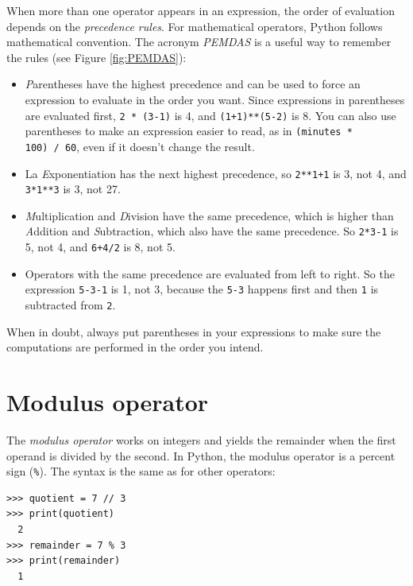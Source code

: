 When more than one operator appears in an expression, the order of evaluation depends on the \emph{precedence rules}. For mathematical operators, Python follows mathematical convention. The acronym \emph{PEMDAS}  is a useful way to remember the rules (see Figure \ref{fig:PEMDAS}):


\begin{itemize}
\item
  \emph{P}arentheses have the highest precedence and can be used to force an expression to evaluate in the order you want. Since expressions in parentheses are evaluated first, \texttt{2\ *\ (3-1)} is 4, and \texttt{(1+1)**(5-2)} is 8. You can also use parentheses to make an expression easier to read, as in \texttt{(minutes\ * 100)\ /\ 60}, even if it doesn't change the result.
\item
  La \emph{E}xponentiation has the next highest precedence, so \texttt{2**1+1} is 3, not 4, and \texttt{3*1**3} is 3, not 27.
\item
  \emph{M}ultiplication and \emph{D}ivision have the same precedence, which is higher than \emph{A}ddition and \emph{S}ubtraction, which also have the same precedence. So \texttt{2*3-1} is 5, not 4, and \texttt{6+4/2} is 8, not 5.
\item
  Operators with the same precedence are evaluated from left to right. So the expression \texttt{5-3-1} is 1, not 3, because the \texttt{5-3} happens first and then \texttt{1} is subtracted from \texttt{2}.
\end{itemize}

When in doubt, always put parentheses in your expressions to make sure the computations are performed in the order you intend.

\hypertarget{operador-muxf3dulo}{%
\section{Modulus operator
}\label{operador-muxf3dulo}}

 

The \emph{modulus operator} works on integers and yields the remainder when the first operand is divided by the second. In Python, the modulus operator is a percent sign (\texttt{\%}). The syntax is the same as for other operators:

\begin{Verbatim}[frame=single]
>>> quotient = 7 // 3
>>> print(quotient)
  2
>>> remainder = 7 % 3
>>> print(remainder)
  1
\end{Verbatim}


